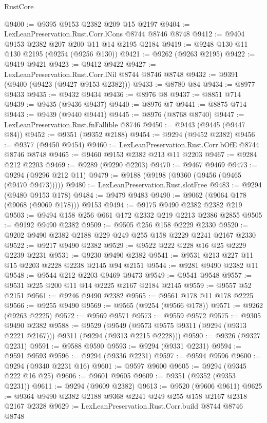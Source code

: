 \begin{lexlean}{RustCore}
\begin{coremodule}
@9400 := @9395 @9153 @2382 @209 @15 @2197
@9404 := LexLeanPreservation.Rust.Corr.lCons @8744 @8746 @8748
@9412 := @9404 @9153 @2382 @207 @200 @11 @14 @2195 @2184
@9419 := @9248 @130 @11 @130 @2195 (@9254 (@9256 @130))
@9421 := @9262 (@9263 @2195)
@9422 := @9419 @9421
@9423 := @9412 @9422
@9427 := LexLeanPreservation.Rust.Corr.lNil @8744 @8746 @8748
@9432 := @9391 (@9400 (@9423 (@9427 @9153 @2382)))
@9433 := @8780 @84
@9434 := @8977 @9433
@9435 := @9432 @9434
@9436 := @8976 @8
@9437 := @8851 @714
@9439 := @9435 (@9436 @9437)
@9440 := @8976 @7
@9441 := @8875 @714
@9443 := @9439 (@9440 @9441)
@9445 := @8976 (@8768 @8740)
@9447 := LexLeanPreservation.Rust.fnFallible @8746
@9450 := @9443 (@9445 (@9447 @84))
@9452 := @9351 (@9352 @2188)
@9454 := @9294 (@9452 @2382)
@9456 := @9377 (@9450 @9454)
@9460 := LexLeanPreservation.Rust.Corr.bOfE @8744 @8746 @8748
@9465 := @9460 @9153 @2382 @213 @11 @2203
@9467 := @9284 @212 @2203
@9469 := @9289 (@9290 @2203)
@9470 := @9467 @9469
@9473 := @9294 (@9296 @212 @11)
@9479 := @9188 (@9198 (@9360 (@9456 (@9465 (@9470 @9473)))))
@9480 := LexLeanPreservation.Rust.slotFree
@9483 := @9294 (@9480 @9153 @178)
@9484 := @9479 @9483
@9490 := @9062 (@9064 @178 (@9068 (@9069 @178))) @9153
@9494 := @9175 @9490 @2382 @2382 @219
@9503 := @9494 @158 @256 @661 @172 @2332 @219 @2213 @2386 @2855
@9505 := @9192 @9490 @2382
@9509 := @9505 @256 @158 @2229 @2330
@9520 := @9202 @9490 @2382 @2188 @229 @249 @255 @158 @2229 @2241 @2167 @2330
@9522 := @9217 @9490 @2382
@9529 := @9522 @222 @228 @16 @25 @2229 @2239 @2231
@9531 := @9230 @9490 @2382
@9541 := @9531 @213 @227 @11 @15 @2203 @2228 @2238 @2145 @94 @2151
@9544 := @9281 @9490 @2382 @11
@9548 := @9544 @212 @2203 @9469 @9473
@9549 := @9541 @9548
@9557 := @9531 @225 @200 @11 @14 @2225 @2167 @2184 @2145
@9559 := @9557 @52 @2151
@9561 := @9246 @9490 @2382
@9565 := @9561 @178 @11 @178 @2225
@9566 := @9255 @9490
@9569 := @9565 (@9254 (@9566 @178))
@9571 := @9262 (@9263 @2225)
@9572 := @9569 @9571
@9573 := @9559 @9572
@9575 := @9305 @9490 @2382
@9588 := @9529
    (@9549 (@9573 @9575 @9311 (@9294 (@9313 @2221 @2167))) @9311 (@9294 (@9313 @2215 @2228)))
@9590 := @9326 (@9327 @2231)
@9591 := @9588 @9590
@9593 := @9294 (@9331 @2231)
@9594 := @9591 @9593
@9596 := @9294 (@9336 @2231)
@9597 := @9594 @9596
@9600 := @9294 (@9340 @2231 @16)
@9601 := @9597 @9600
@9605 := @9294 (@9345 @222 @16 @25)
@9606 := @9601 @9605
@9609 := @9351 (@9352 (@9353 @2231))
@9611 := @9294 (@9609 @2382)
@9613 := @9520 (@9606 @9611)
@9625 := @9364 @9490 @2382 @2188 @9368 @2241 @249 @255 @158 @2167 @2318 @2167 @2328
@9629 := LexLeanPreservation.Rust.Corr.build @8744 @8746 @8748

\end{coremodule}
\end{lexlean}
